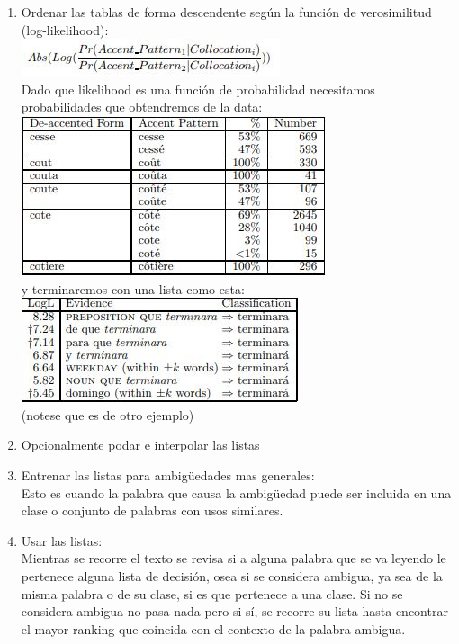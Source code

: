 \begin{enumerate}
    \item Ordenar las tablas de forma descendente según la función de verosimilitud (log-likelihood\cite{log-likelihood}):\\
    \includegraphics[]{img/listas/log-likelihood.JPG}\cite{DecisionLists}\\
    Dado que likelihood es una función de probabilidad necesitamos probabilidades que obtendremos de la data:\cite{DecisionLists}\\
    \includegraphics[]{img/listas/Listas_decision6.JPG}\\
    y terminaremos con una lista como esta:\cite{DecisionLists}\\
    \includegraphics[]{img/listas/Listas_decision4.JPG}\\(notese que es de otro ejemplo)
    
    \item Opcionalmente podar e interpolar las listas
    \item Entrenar las listas para ambigüedades mas generales:\\
    Esto es cuando la palabra que causa la ambigüedad puede ser incluida en una clase o conjunto de palabras con usos similares.
    \item Usar las listas:\\
    Mientras se recorre el texto se revisa si a alguna palabra que se va leyendo le pertenece alguna lista de decisión, osea si se considera ambigua, ya sea de la misma palabra o de su clase, si es que pertenece a una clase. Si no se considera ambigua no pasa nada pero si sí, se recorre su lista hasta encontrar el mayor ranking que coincida con el contexto de la palabra ambigua.
\end{enumerate}

